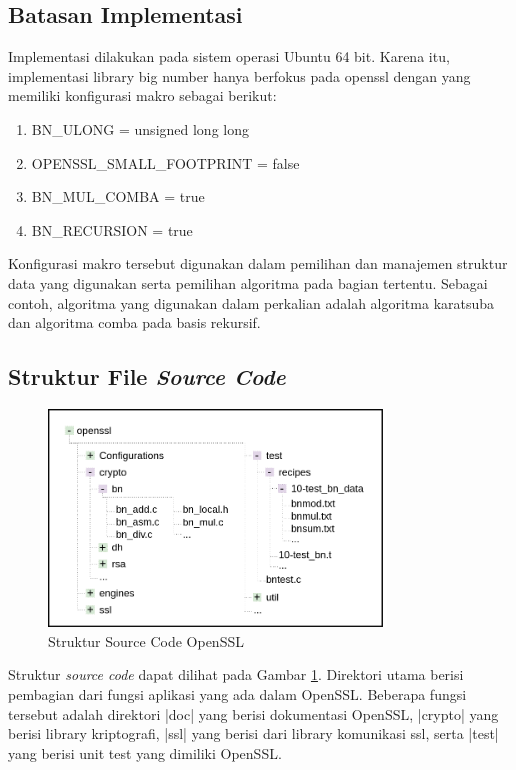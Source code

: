   \subsection{Batasan Implementasi}
    Implementasi dilakukan pada sistem operasi Ubuntu 64 bit. Karena itu, implementasi library big number hanya berfokus pada openssl dengan yang memiliki konfigurasi makro sebagai berikut:
    \begin{enumerate}[label=\roman*.]
      \item BN\_ULONG = unsigned long long
      \item OPENSSL\_SMALL\_FOOTPRINT = false
      \item BN\_MUL\_COMBA = true
      \item BN\_RECURSION = true

    \end{enumerate}

    Konfigurasi makro tersebut digunakan dalam pemilihan dan manajemen struktur data yang digunakan serta pemilihan algoritma pada bagian tertentu. Sebagai contoh, algoritma yang digunakan dalam perkalian adalah algoritma karatsuba dan algoritma comba pada basis rekursif.


  \subsection{Struktur File \textit{Source Code}}

    \begin{figure}[h]
      \centering
      \includegraphics[width=0.8\textwidth]{resources/img/ch-4/file-tree.png}
      \caption{Struktur Source Code OpenSSL}
      \label{fig:ossl_file_structure}
    \end{figure}

    Struktur \textit{source code} dapat dilihat pada Gambar \ref{fig:ossl_file_structure}. Direktori utama berisi pembagian dari fungsi aplikasi yang ada dalam OpenSSL. Beberapa fungsi tersebut adalah direktori |doc| yang berisi dokumentasi OpenSSL, |crypto| yang berisi library kriptografi, |ssl| yang berisi dari library komunikasi ssl, serta |test| yang berisi unit test yang dimiliki OpenSSL.

